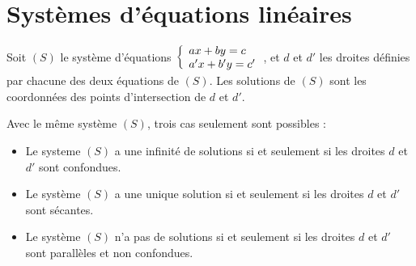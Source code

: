 \section{Systèmes d'équations linéaires}

\begin{propriete}
  Soit $(S)$ le système d'équations $\left\{\begin{array}{l}ax+by=c\\a'x+b'y=c'\end{array}\right.$, et $d$ et $d'$ les droites définies par chacune des deux équations de $(S)$. Les solutions de $(S)$ sont les coordonnées des points d'intersection de $d$ et $d'$.
\end{propriete}

\begin{corollaire}Avec le même système $(S)$, trois cas seulement sont possibles :
  \begin{itemize}
    \item Le systeme $(S)$ a une infinité de solutions si et seulement si les droites $d$ et $d'$ sont confondues.
    \item Le système $(S)$ a une unique solution si et seulement si les droites $d$ et $d'$ sont sécantes.
    \item Le système $(S)$ n'a pas de solutions si et seulement si les droites $d$ et $d'$ sont parallèles et non confondues.
  \end{itemize}
\end{corollaire}

